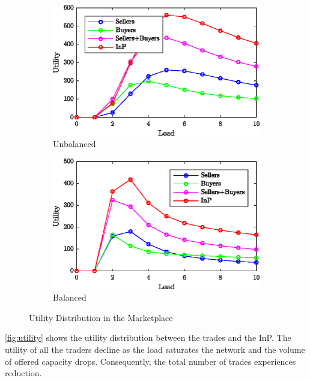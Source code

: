 \begin{figure}%
\centering
\begin{subfigure}{0.7\columnwidth}
\includegraphics[width=\columnwidth]{Figures/U-Utility-s-b-traders.eps}%
\caption{Unbalanced}%
\label{fig:utility:unbalanced}%
\end{subfigure}\hfill%
\begin{subfigure}{0.7\columnwidth}
\includegraphics[width=\columnwidth]{Figures/B-Utility-s-b-traders.eps}%
\caption{Balanced}%
\label{fig:utility:balanced}%
\end{subfigure}\hfill%
\caption{Utility Distribution in the Marketplace}
\label{fig:utility}%
\end{figure}
\autoref{fig:utility} shows the utility distribution between the trades and the InP. The utility of all the traders decline as the load saturates the network and the volume of offered capacity drops. Consequently, the total number of trades experiences reduction.


